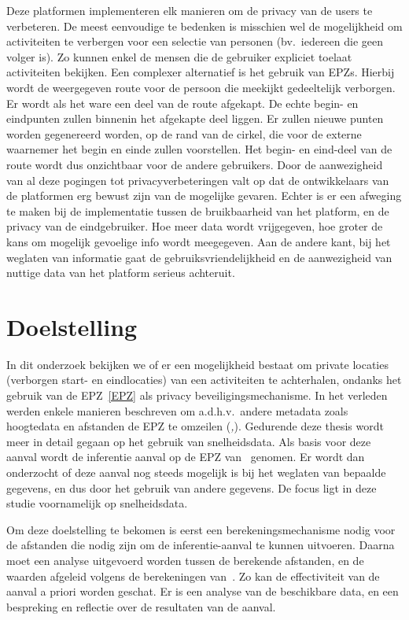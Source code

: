 Deze platformen implementeren elk manieren om de privacy van de users te
verbeteren. De meest eenvoudige te bedenken is misschien wel de mogelijkheid om
activiteiten te verbergen voor een selectie van personen (bv.\ iedereen die
geen volger is). Zo kunnen enkel de mensen die de gebruiker expliciet toelaat
activiteiten bekijken. Een complexer alternatief is het gebruik van \acp{EPZ}.
Hierbij wordt de weergegeven route voor de persoon die meekijkt gedeeltelijk
verborgen. Er wordt als het ware een deel van de route afgekapt. De echte
begin- en eindpunten zullen binnenin het afgekapte deel liggen. Er zullen
nieuwe punten worden gegenereerd worden, op de rand van de cirkel, die voor de
externe waarnemer het begin en einde zullen voorstellen. Het begin- en
eind-deel van de route wordt dus onzichtbaar voor de andere gebruikers. Door de
aanwezigheid van al deze pogingen tot privacyverbeteringen valt op dat de
ontwikkelaars van de platformen erg bewust zijn van de mogelijke gevaren.
Echter is er een afweging te maken bij de implementatie tussen de bruikbaarheid
van het platform, en de privacy van de eindgebruiker. Hoe meer data wordt
vrijgegeven, hoe groter de kans om mogelijk gevoelige info wordt meegegeven.
Aan de andere kant, bij het weglaten van informatie gaat de
gebruiksvriendelijkheid en de aanwezigheid van nuttige data van het platform
serieus achteruit.

\section{Doelstelling}
In dit onderzoek bekijken we of er een mogelijkheid bestaat om private locaties
(verborgen start- en eindlocaties) van een activiteiten te achterhalen, ondanks
het gebruik van de \ac{EPZ}~\ref{EPZ} als privacy beveiligingsmechanisme. In
het verleden werden enkele manieren beschreven om a.d.h.v.\ andere metadata
zoals hoogtedata en afstanden de \ac{EPZ} te omzeilen
(\textit{\cite{Dhondt_Pochat_Voulimeneas_Joosen_Volckaert_2022},\cite{Verdonck_2022}}).
Gedurende deze thesis wordt meer in detail gegaan op het gebruik van
snelheidsdata. Als basis voor deze aanval wordt de inferentie aanval op de EPZ
van~\citeauthor{Dhondt_Pochat_Voulimeneas_Joosen_Volckaert_2022} genomen. Er
wordt dan onderzocht of deze aanval nog steeds mogelijk is bij het weglaten van
bepaalde gegevens, en dus door het gebruik van andere gegevens. De focus ligt
in deze studie voornamelijk op snelheidsdata.

Om deze doelstelling te bekomen is eerst een berekeningsmechanisme nodig voor
de afstanden die nodig zijn om de inferentie-aanval te kunnen uitvoeren. Daarna
moet een analyse uitgevoerd worden tussen de berekende afstanden, en de waarden
afgeleid volgens de berekeningen
van~\citeauthor{Dhondt_Pochat_Voulimeneas_Joosen_Volckaert_2022}. Zo kan de
effectiviteit van de aanval a priori worden geschat. Er is een analyse van de
beschikbare data, en een bespreking en reflectie over de resultaten van de
aanval.